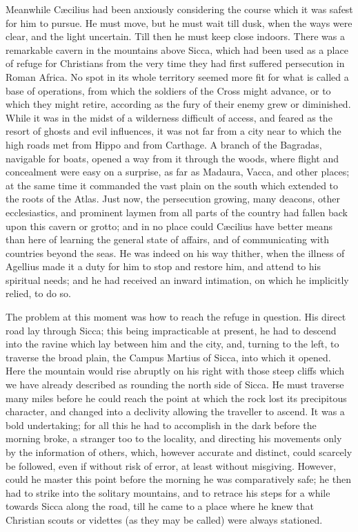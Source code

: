 Meanwhile Cæcilius had been anxiously considering the course which
it was safest for him to pursue. He must move, but he must wait till
dusk, when the ways were clear, and the light uncertain. Till then he
must keep close indoors. There was a remarkable cavern in the
mountains above Sicca, which had been used as a place of refuge for
Christians from the very time they had first suffered persecution in
Roman Africa. No spot in its whole territory seemed more fit for what
is called a base of operations, from which the soldiers of the Cross
might advance, or to which they might retire, according as the
fury of their enemy grew or diminished. While it was in the midst of a
wilderness difficult of access, and feared as the resort of ghosts and
evil influences, it was not far from a city near to which the high
roads met from Hippo and from Carthage. A branch of the Bagradas,
navigable for boats, opened a way from it through the woods, where
flight and concealment were easy on a surprise, as far as Madaura,
Vacca, and other places; at the same time it commanded the vast plain
on the south which extended to the roots of the Atlas. Just now, the
persecution growing, many deacons, other ecclesiastics, and prominent
laymen from all parts of the country had fallen back upon this cavern
or grotto; and in no place could Cæcilius have better means than here
of learning the general state of affairs, and of communicating with
countries beyond the seas. He was indeed on his way thither, when the
illness of Agellius made it a duty for him to stop and restore him,
and attend to his spiritual needs; and he had received an inward
intimation, on which he implicitly relied, to do so.

The problem at this moment was how to reach the refuge in question.
His direct road lay through Sicca; this being impracticable at
present, he had to descend into the ravine which lay between him and
the city, and, turning to the left, to traverse the broad plain, the
Campus Martius of Sicca, into which it opened. Here the mountain would
rise abruptly on his right with those steep cliffs which we have
already described as rounding the north side of Sicca. He must
traverse many miles before he could reach the point at which the rock
lost its precipitous character, and changed into a declivity allowing
the traveller to ascend. It was a bold undertaking; for all this he
had to accomplish in the dark before the morning broke, a stranger too
to the locality, and directing his movements only by the information
of others, which, however accurate and distinct, could scarcely be
followed, even if without risk of error, at least without misgiving.
However, could he master this point before the morning he was
comparatively safe; he then had to strike into the solitary mountains,
and to retrace his steps for a while towards Sicca along the road,
till he came to a place where he knew that Christian scouts or
videttes (as they may be called) were always stationed.

